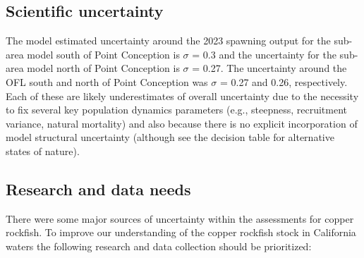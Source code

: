 \documentclass[11pt,
  english,
  letterpaper,
]{article}
\begin{document}
\pagebreak

\hypertarget{scientific-uncertainty}{%
\subsection*{Scientific uncertainty}\label{scientific-uncertainty}}

The model estimated uncertainty around the 2023 spawning output for the sub-area model south of Point Conception is \(\sigma\) = 0.3 and the uncertainty for the sub-area model north of Point Conception is \(\sigma\) = 0.27. The uncertainty around the OFL south and north of Point Conception was \(\sigma\) = 0.27 and 0.26, respectively. Each of these are likely underestimates of overall uncertainty due to the necessity to fix several key population dynamics parameters (e.g., steepness, recruitment variance, natural mortality) and also because there is no explicit incorporation of model structural uncertainty (although see the decision table for alternative states of nature).

\hypertarget{research-and-data-needs}{%
\subsection*{Research and data needs}\label{research-and-data-needs}}

There were some major sources of uncertainty within the assessments for copper rockfish. To improve our understanding of the copper rockfish stock in California waters the following research and data collection should be prioritized:
\end{document}
